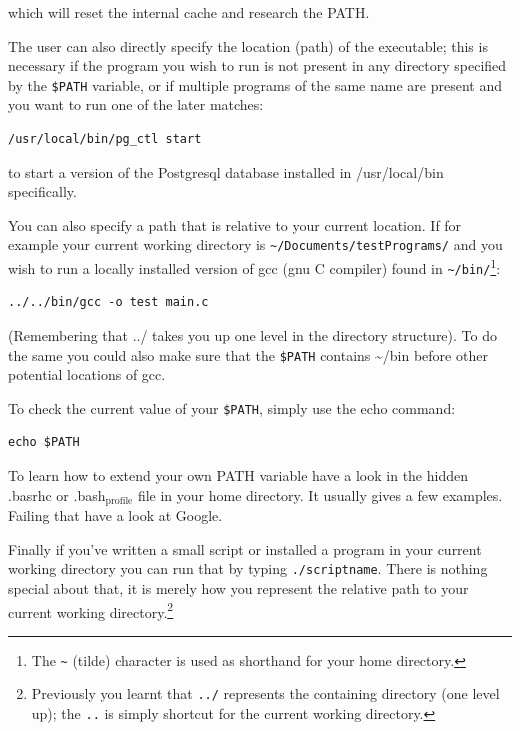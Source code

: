 \documentclass[11pt]{article}
\begin{document}
which will reset the internal cache and research the PATH.

The user can also directly specify the location (path) of the
executable; this is necessary if the program you wish to run is not
present in any directory specified by the \texttt{\$PATH} variable, or if
multiple programs of the same name are present and you want to run one
of the later matches:

\begin{verbatim}
/usr/local/bin/pg_ctl start
\end{verbatim}

to start a version of the Postgresql database installed in
/usr/local/bin specifically.

You can also specify a path that is relative to your current location.
If for example your current working directory is
\texttt{\textasciitilde{}/Documents/testPrograms/} and you wish to run a locally installed
version of gcc (gnu C compiler) found in \texttt{\textasciitilde{}/bin/}\footnote{The \texttt{\textasciitilde{}} (tilde) character is used as shorthand for your home
directory.}:

\begin{verbatim}
../../bin/gcc -o test main.c
\end{verbatim}


(Remembering that ../ takes you up one level in the directory
structure). To do the same you could also make sure that the \texttt{\$PATH}
contains \textasciitilde{}/bin before other potential locations of gcc.

To check the current value of your \texttt{\$PATH}, simply use the echo command:

\begin{verbatim}
echo $PATH
\end{verbatim}


To learn how to extend your own PATH variable have a look in the hidden
.basrhc or .bash\(_{\text{profile}}\) file in your home directory. It usually gives a
few examples. Failing that have a look at Google.

Finally if you've written a small script or installed a program in your
current working directory you can run that by typing \texttt{./scriptname}. There
is nothing special about that, it is merely how you represent the
relative path to your current working directory.\footnote{Previously you learnt that \texttt{../} represents the containing directory
(one level up); the \texttt{..} is simply shortcut for the current working directory.}
\end{document}
